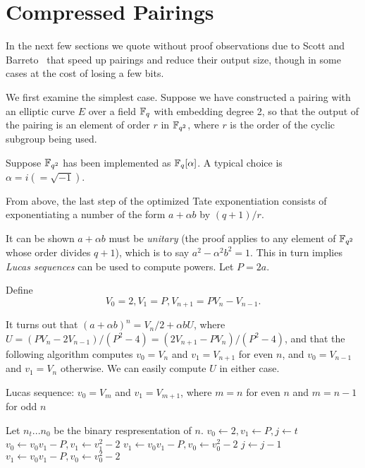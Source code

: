 \section {\label{sec:compressedpairings}Compressed Pairings}

In the next few sections we quote without proof observations
due to Scott and Barreto~\cite{compressedpairings} that speed up pairings and
reduce their output size, though in some cases at the cost of losing a few bits.

We first examine the simplest case. Suppose we have constructed a pairing
with an elliptic curve $E$ over a field $\mathbb{F}_q$ with embedding degree 2,
so that the output of the pairing is an element of order $r$
in $\mathbb{F}_{q^2}$, where $r$ is the order of the cyclic subgroup being used.

Suppose $\mathbb{F}_{q^2}$ has been implemented as $\mathbb{F}_q[\alpha]$.
A typical choice is $\alpha = i (=\sqrt{-1})$.

From above, the last step of the optimized Tate exponentiation
consists of exponentiating a number of the form $a + \alpha b$ by
$(q + 1) / r$.

It can be shown $a + \alpha b$ must be \emph {unitary} (the proof
applies to any element of $\mathbb{F}_{q^2}$ whose order divides $q+1$), which
is to say $a^2 - \alpha^2 b^2 = 1$. This in turn implies
\emph{Lucas sequences} can be used to compute powers. Let $P = 2a$.

Define
\[ V_0 = 2, V_1 = P, V_{n+1} = P V_n - V_{n-1} . \]

It turns out that $(a+\alpha b)^n = V_n / 2 + \alpha b U$,
where $U = (P V_n - 2 V_{n-1}) / (P^2 - 4)
= (2 V_{n+1} - P V_n) / (P^2 - 4)$,
and that the following algorithm
computes $v_0 = V_n$ and $v_1 = V_{n+1}$ for even $n$,
and $v_0 = V_{n-1}$ and $v_1 = V_n$ otherwise.
We can easily compute $U$ in either case.

\begin{algorithm}
\caption {Lucas sequence: $v_0 = V_m$ and $v_1 = V_{m+1}$,
where $m = n$ for even $n$ and $m = n-1$ for odd $n$}
\begin{algorithmic}[1]
\STATE Let $n_t ... n_0$ be the binary respresentation of $n$.
\STATE $v_0 \gets 2, v_1 \gets P, j \gets t$
	\STATE $v_0 \gets v_0 v_1 - P, v_1 \gets v_1^2 - 2$
    \ELSE
	\STATE $v_1 \gets v_0 v_1 - P, v_0 \gets v_0^2 - 2$
    \ENDIF
    \STATE $j \gets j - 1$
\ENDWHILE
\STATE $v_1 \gets v_0 v_1 - P, v_0 \gets v_0^2 - 2$
\end{algorithmic}
\end{algorithm}

